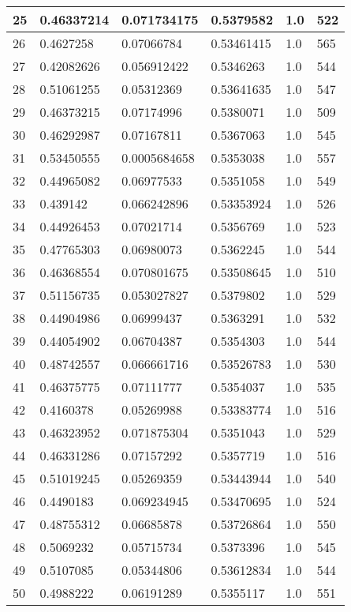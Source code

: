 \begin{longtable}{|l|l|l|l|l|l|}
25 & 0.46337214 & 0.071734175 & 0.5379582 & 1.0 & 522 \\ \hline 
26 & 0.4627258 & 0.07066784 & 0.53461415 & 1.0 & 565 \\ \hline 
27 & 0.42082626 & 0.056912422 & 0.5346263 & 1.0 & 544 \\ \hline 
28 & 0.51061255 & 0.05312369 & 0.53641635 & 1.0 & 547 \\ \hline 
29 & 0.46373215 & 0.07174996 & 0.5380071 & 1.0 & 509 \\ \hline 
30 & 0.46292987 & 0.07167811 & 0.5367063 & 1.0 & 545 \\ \hline 
31 & 0.53450555 & 0.0005684658 & 0.5353038 & 1.0 & 557 \\ \hline 
32 & 0.44965082 & 0.06977533 & 0.5351058 & 1.0 & 549 \\ \hline 
33 & 0.439142 & 0.066242896 & 0.53353924 & 1.0 & 526 \\ \hline 
34 & 0.44926453 & 0.07021714 & 0.5356769 & 1.0 & 523 \\ \hline 
35 & 0.47765303 & 0.06980073 & 0.5362245 & 1.0 & 544 \\ \hline 
36 & 0.46368554 & 0.070801675 & 0.53508645 & 1.0 & 510 \\ \hline 
37 & 0.51156735 & 0.053027827 & 0.5379802 & 1.0 & 529 \\ \hline 
38 & 0.44904986 & 0.06999437 & 0.5363291 & 1.0 & 532 \\ \hline 
39 & 0.44054902 & 0.06704387 & 0.5354303 & 1.0 & 544 \\ \hline 
40 & 0.48742557 & 0.066661716 & 0.53526783 & 1.0 & 530 \\ \hline 
41 & 0.46375775 & 0.07111777 & 0.5354037 & 1.0 & 535 \\ \hline 
42 & 0.4160378 & 0.05269988 & 0.53383774 & 1.0 & 516 \\ \hline 
43 & 0.46323952 & 0.071875304 & 0.5351043 & 1.0 & 529 \\ \hline 
44 & 0.46331286 & 0.07157292 & 0.5357719 & 1.0 & 516 \\ \hline 
45 & 0.51019245 & 0.05269359 & 0.53443944 & 1.0 & 540 \\ \hline 
46 & 0.4490183 & 0.069234945 & 0.53470695 & 1.0 & 524 \\ \hline 
47 & 0.48755312 & 0.06685878 & 0.53726864 & 1.0 & 550 \\ \hline 
48 & 0.5069232 & 0.05715734 & 0.5373396 & 1.0 & 545 \\ \hline 
49 & 0.5107085 & 0.05344806 & 0.53612834 & 1.0 & 544 \\ \hline 
50 & 0.4988222 & 0.06191289 & 0.5355117 & 1.0 & 551 \\ \hline 
\end{longtable}